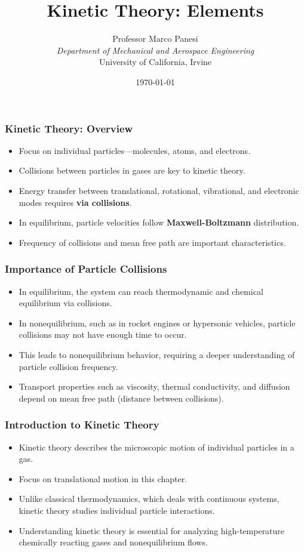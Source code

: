 \documentclass{beamer}
\title{Kinetic Theory: Elements}
\author[Prof. Panesi]{Professor Marco Panesi\\[2cm]
\emph{Department of Mechanical and Aerospace Engineering}\\
University of California, Irvine}
\date{\today}
\begin{document}
\begin{frame}
    \titlepage
\end{frame}

\begin{frame}
\frametitle{Kinetic Theory: Overview}
\begin{itemize}
    \item Focus on individual particles—molecules, atoms, and electrons.
    \item Collisions between particles in gases are key to kinetic theory.
    \item Energy transfer between translational, rotational, vibrational, and electronic modes requires {\bf via collisions}.
    \item In equilibrium, particle velocities follow {\bf Maxwell-Boltzmann} distribution.
    \item Frequency of collisions and mean free path are important characteristics.
\end{itemize}
\end{frame}

\begin{frame}
\frametitle{Importance of Particle Collisions}
\begin{itemize}
    \item In equilibrium, the system can reach thermodynamic and chemical equilibrium via collisions.
    \item In nonequilibrium, such as in rocket engines or hypersonic vehicles, particle collisions may not have enough time to occur.
    \item This leads to nonequilibrium behavior, requiring a deeper understanding of particle collision frequency.
    \item Transport properties such as viscosity, thermal conductivity, and diffusion depend on mean free path (distance between collisions).
\end{itemize}
\end{frame}

\begin{frame}
\frametitle{Introduction to Kinetic Theory}
\begin{itemize}
    \item Kinetic theory describes the microscopic motion of individual particles in a gas.
    \item Focus on translational motion in this chapter.
    \item Unlike classical thermodynamics, which deals with continuous systems, kinetic theory studies individual particle interactions.
    \item Understanding kinetic theory is essential for analyzing high-temperature chemically reacting gases and nonequilibrium flows.
\end{itemize}
\end{frame}
\end{document}
